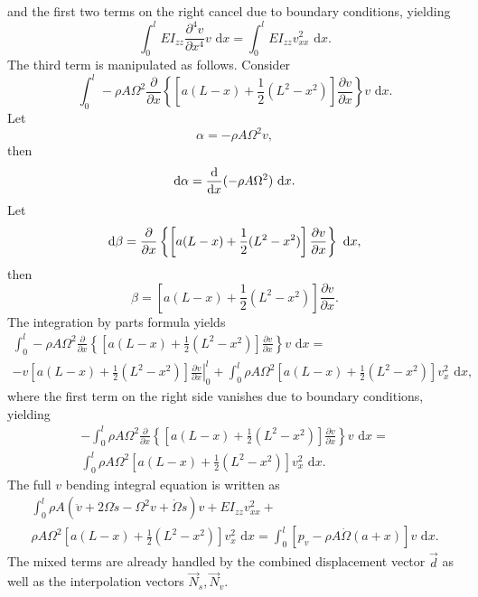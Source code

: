 and the first two terms on the right cancel due to boundary conditions, yielding
\begin{equation}
\int_0^lEI_{zz}\frac{\partial^4 v}{\partial x^4}v\text{ d}x =  \int_0^lEI_{zz}v_{xx}^2\text{ d}x.
\end{equation}
The third term is manipulated as follows. Consider
\begin{equation}
\int_0^l-\rho A\Omega^2\frac{\partial}{\partial x}\left\lbrace \left[a(L-x)+\frac{1}{2}(L^2-x^2)\right]\frac{\partial v}{\partial x}\right\rbrace v\text{ d}x.
\end{equation}
Let
\begin{equation}
\alpha = -\rho A\Omega^2v,
\end{equation}
then
\begin{equation}
\text d\alpha = \frac{\text d}{\text dx}(-\rho A\Omega^2)\text{ d}x.
\end{equation}
Let
\begin{equation}
\text d\beta = \frac{\partial}{\partial x}\left\lbrace \left[a(L-x)+\frac{1}{2}(L^2-x^2)\right]\frac{\partial v}{\partial x}\right\rbrace\text{ d}x,
\end{equation}
then
\begin{equation}
\beta = \left[a(L-x)+\frac{1}{2}(L^2-x^2)\right]\frac{\partial v}{\partial x}.
\end{equation}
The integration by parts formula yields
\begin{eqnarray}
\label{eq:v.disc.int.by.parts.2}
\int_0^l-\rho A\Omega^2\frac{\partial}{\partial x}\left\lbrace \left[a(L-x)+\frac{1}{2}(L^2-x^2)\right]\frac{\partial v}{\partial x}\right\rbrace v\text{ d}x =\\
-\left.v\left[a(L-x)+\frac{1}{2}(L^2-x^2)\right]\frac{\partial v}{\partial x}\right|_0^l+\int_0^l \rho A\Omega^2\left[a(L-x)+\frac{1}{2}(L^2-x^2)\right]v_x^2\text{ d}x, \nonumber
\end{eqnarray}
where the first term on the right side vanishes due to boundary conditions, yielding
\begin{eqnarray}
-\int_0^l\rho A\Omega^2\frac{\partial}{\partial x}\left\lbrace \left[a(L-x)+\frac{1}{2}(L^2-x^2)\right]\frac{\partial v}{\partial x}\right\rbrace v\text{ d}x =\\
 \int_0^l \rho A\Omega^2\left[a(L-x)+\frac{1}{2}(L^2-x^2)\right]v_x^2\text{ d}x. \nonumber
\end{eqnarray}
The full $v$ bending integral equation is written as
\begin{eqnarray}
\label{eq:v_bending_integral_eqn}
\int_0^l\rho A(\ddot v + 2\Omega\dot s-\Omega^2v+\dot\Omega s)v+EI_{zz}v_{xx}^2+\\
\rho A\Omega^2\left[a(L-x)+\frac{1}{2}(L^2-x^2)\right]v_x^2\text{ d}x = \int_0^l[p_v - \rho A\dot\Omega(a+x)]v\text{ d}x. \nonumber
\end{eqnarray}
The mixed terms are already handled by the combined displacement vector $\vec d$ as well as the interpolation vectors $\vec N_s,\vec N_v$.

